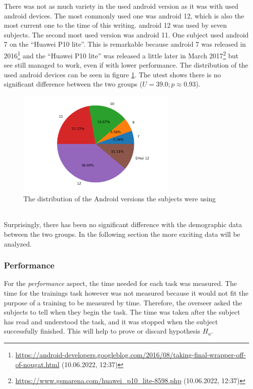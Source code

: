 There was not as much variety in the used \gls{android} version as it was with used \gls{android} devices. 
The most commonly used one was \gls{android} 12, which is also the most current one to the time of this writing.
\gls{android} 12 was used by seven subjects.
The second most used version was \gls{android} 11.
One subject used \gls{android} 7 on the \enquote{Huawei P10 lite}.
This is remarkable because \gls{android} 7 was released in 2016\footnote{\url{https://android-developers.googleblog.com/2016/08/taking-final-wrapper-off-of-nougat.html} (10.06.2022, 12:37)} and the \enquote{Huawei P10 lite} was released a little later in March 2017\footnote{\url{https://www.gsmarena.com/huawei_p10_lite-8598.php} (10.06.2022, 12:37)} but \gls{see} still managed to work, even if with lower performance.
The distribution of the used \gls{android} devices can be seen in figure \ref{fig:android_version}.
The \gls{utest} shows there is no significant difference between the two groups ($U = 39.0; p \approx 0.93$).

\begin{figure}[htb]
  \centering
  \includegraphics[width=0.7\textwidth]{Evaluation/img/droid_version.png}
  \caption{The distribution of the Android versions the subjects were using}\label{fig:android_version}
\end{figure}

\mbox{}\\
Surprisingly, there has been no significant difference with the demographic data between the two groups.
In the following section the more exciting data will be analyzed. 

\subsubsection{Performance}
For the \textit{performance} aspect, the time needed for each task was measured.
The time for the trainings task however was not measured because it would not fit the purpose of a training to be measured by time.
Therefore, the overseer asked the subjects to tell when they begin the task. 
The time was taken after the subject has read and understood the task, and it was stopped when the subject successfully finished.
This will help to prove or discard hypothesis $H_{a}$.

